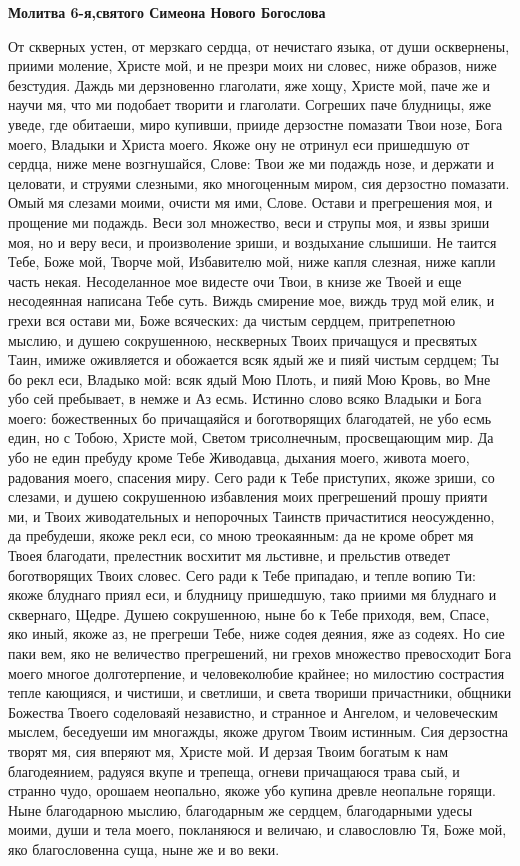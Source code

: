 \medskip
\bfseries Молитва 6-я,святого Симеона Нового Богослова\normalfont{}\nopagebreak


От скверных устен, от мерзкаго сердца, от нечистаго языка, от души осквернены, приими моление, Христе мой, и не презри моих ни словес, ниже образов, ниже безстудия. Даждь ми дерзновенно глаголати, яже хощу, Христе мой, паче же и научи мя, что ми подобает творити и глаголати. Согреших паче блудницы, яже уведе, где обитаеши, миро купивши, прииде дерзостне помазати Твои нозе, Бога моего, Владыки и Христа моего. Якоже ону не отринул еси пришедшую от сердца, ниже мене возгнушайся, Слове: Твои же ми подаждь нозе, и держати и целовати, и струями слезными, яко многоценным миром, сия дерзостно помазати. Омый мя слезами моими, очисти мя ими, Слове. Остави и прегрешения моя, и прощение ми подаждь. Веси зол множество, веси и струпы моя, и язвы зриши моя, но и веру веси, и произволение зриши, и воздыхание слышиши. Не таится Тебе, Боже мой, Творче мой, Избавителю мой, ниже капля слезная, ниже капли часть некая. Несоделанное мое видесте очи Твои, в книзе же Твоей и еще несодеянная написана Тебе суть. Виждь смирение мое, виждь труд мой елик, и грехи вся остави ми, Боже всяческих: да чистым сердцем, притрепетною мыслию, и душею сокрушенною, нескверных Твоих причащуся и пресвятых Таин, имиже оживляется и обожается всяк ядый же и пияй чистым сердцем; Ты бо рекл еси, Владыко мой: всяк ядый Мою Плоть, и пияй Мою Кровь, во Мне убо сей пребывает, в немже и Аз есмь. Истинно слово всяко Владыки и Бога моего: божественных бо причащаяйся и боготворящих благодатей, не убо есмь един, но с Тобою, Христе мой, Светом трисолнечным, просвещающим мир. Да убо не един пребуду кроме Тебе Живодавца, дыхания моего, живота моего, радования моего, спасения миру. Сего ради к Тебе приступих, якоже зриши, со слезами, и душею сокрушенною избавления моих прегрешений прошу прияти ми, и Твоих живодательных и непорочных Таинств причаститися неосужденно, да пребудеши, якоже рекл еси, со мною треокаянным: да не кроме обрет мя Твоея благодати, прелестник восхитит мя льстивне, и прельстив отведет боготворящих Твоих словес. Сего ради к Тебе припадаю, и тепле вопию Ти: якоже блуднаго приял еси, и блудницу пришедшую, тако приими мя блуднаго и сквернаго, Щедре. Душею сокрушенною, ныне бо к Тебе приходя, вем, Спасе, яко иный, якоже аз, не прегреши Тебе, ниже содея деяния, яже аз содеях. Но сие паки вем, яко не величество прегрешений, ни грехов множество превосходит Бога моего многое долготерпение, и человеколюбие крайнее; но милостию сострастия тепле кающияся, и чистиши, и светлиши, и света твориши причастники, общники Божества Твоего соделоваяй независтно, и странное и Ангелом, и человеческим мыслем, беседуеши им многажды, якоже другом Твоим истинным. Сия дерзостна творят мя, сия вперяют мя, Христе мой. И дерзая Твоим богатым к нам благодеянием, радуяся вкупе и трепеща, огневи причащаюся трава сый, и странно чудо, орошаем неопально, якоже убо купина древле неопальне горящи. Ныне благодарною мыслию, благодарным же сердцем, благодарными удесы моими, души и тела моего, покланяюся и величаю, и славословлю Тя, Боже мой, яко благословенна суща, ныне же и во веки.


